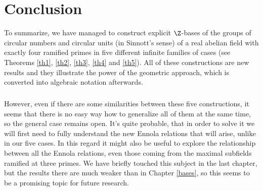 \chapter*{Conclusion}

To summarize, we have managed to construct explicit $\Z$-bases of the groups of circular numbers and circular units (in Sinnott's sense) of a real abelian field with exactly four ramified primes in five different infinite families of cases (see Theorems \ref{th1}, \ref{th2}, \ref{th3}, \ref{th4} and \ref{th5}). All of these constructions  are new results and they illustrate the power of the geometric approach, which is converted into algebraic notation afterwards. 
\paragraph*{}
However, even if there are some similarities between these five constructions, it seems that there is no easy way how to generalize all of them at the same time, so the general case remains open. It's quite probable, that in order to solve it we will first need to fully understand the new Ennola relations that will arise, unlike in our five cases. In this regard it might also be useful to explore the relationship between all the Ennola relations, even those coming from the maximal subfields ramified at three primes. We have briefly touched this subject in the last chapter, but the results there are much weaker than in Chapter \ref{bases}, so this seems to be a promising topic for future research.


